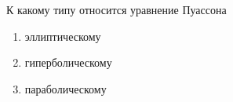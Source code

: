 К какому типу относится уравнение Пуассона

\begin{enumerate}[label=\arabic*)]
    \item эллиптическому
    \item гиперболическому
    \item параболическому
\end{enumerate}

